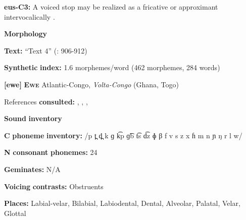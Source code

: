 \documentclass[output=paper]{langsci/langscibook}
\begin{document}
\begin{styleBody}
\textbf{eus-C3:} A voiced stop may be realized as a fricative or approximant intervocalically \citep[19]{Hualde2003}.
\end{styleBody}

\begin{styleBody}
\textbf{Morphology}
\end{styleBody}

\begin{styleBody}
\textbf{Text:} “Text 4” (\citealt{HualdeUrbina2003}: 906-912)
\end{styleBody}

\begin{styleBody}
\textbf{Synthetic} \textbf{index:} 1.6 morphemes/word (462 morphemes, 284 words)
\end{styleBody}

\begin{styleBody}
\textbf{[ewe]}   \textbf{\textsc{Ewe}}  Atlantic-Congo, \textit{Volta-Congo} (Ghana, Togo)
\end{styleBody}

\begin{styleBody}
References \textbf{consulted:} \citet{Ameka1991}, \citet{Duthie1996}, \citet{Jalloh2005}, \citet{Stahlke1971}
\end{styleBody}

\begin{styleBody}
\textbf{Sound} \textbf{inventory}
\end{styleBody}

\begin{styleBody}
\textbf{C} \textbf{phoneme} \textbf{inventory:} /p t̪ d̪ k ɡ k͡p ɡ͡b t͡s d͡z ɸ β f v s z x ɦ m n ɲ ŋ r l w/
\end{styleBody}

\begin{styleBody}
\textbf{N} \textbf{consonant} \textbf{phonemes:} 24
\end{styleBody}

\begin{styleBody}
\textbf{Geminates:} N/A
\end{styleBody}

\begin{styleBody}
\textbf{Voicing} \textbf{contrasts:} Obstruents
\end{styleBody}

\begin{styleBody}
\textbf{Places:} Labial-velar, Bilabial, Labiodental, Dental, Alveolar, Palatal, Velar, Glottal
\end{styleBody}
\end{document}
